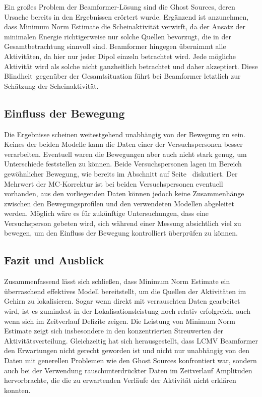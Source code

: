 \documentclass[doc,a4paper,12pt]{apa6}
\makeatletter
\DeclareRobustCommand*{\nameref}[1]{%
      \glqq{\myorg@nameref{#1}}\grqq%
    }%
\makeatother
\begin{document}
Ein großes Problem der Beamformer-Lösung sind die Ghost Sources, deren Ursache bereits in den Ergebnissen erörtert wurde. Ergänzend ist anzunehmen, dass Minimum Norm Estimate die Scheinaktivität verwirft, da der Ansatz der minimalen Energie richtigerweise nur solche Quellen bevorzugt, die in der Gesamtbetrachtung sinnvoll sind. Beamformer hingegen übernimmt alle Aktivitäten, da hier nur jeder Dipol einzeln betrachtet wird. Jede mögliche Aktivität wird als solche nicht ganzheitlich betrachtet und daher akzeptiert. Diese \glqq Blindheit\grqq ~gegenüber der Gesamtsituation führt bei Beamformer letztlich zur Schätzung der Scheinaktivität.

\subsection{Einfluss der Bewegung}

Die Ergebnisse scheinen weitestgehend unabhängig von der Bewegung zu sein. Keines der beiden Modelle kann die Daten einer der Versuchspersonen besser verarbeiten. Eventuell waren die Bewegungen aber auch nicht stark genug, um Unterschiede feststellen zu können. Beide Versuchspersonen lagen im Bereich gewöhnlicher Bewegung, wie bereits im Abschnitt \nameref{sec:ergebnis-vorverarbeitung} auf Seite~\pageref{sec:ergebnis-vorverarbeitung} diskutiert. Der Mehrwert der MC-Korrektur ist bei beiden Versuchspersonen eventuell vorhanden, aus den vorliegenden Daten können jedoch keine Zusammenhänge zwischen den Bewegungsprofilen und den verwendeten Modellen abgeleitet werden. Möglich wäre es für zukünftige Untersuchungen, dass eine Versuchsperson gebeten wird, sich während einer Messung absichtlich viel zu bewegen, um den Einfluss der Bewegung kontrolliert überprüfen zu können.

\subsection{Fazit und Ausblick}

Zusammenfassend lässt sich schließen, dass Minimum Norm Estimate ein überraschend effektives Modell bereitstellt, um die Quellen der Aktivitäten im Gehirn zu lokalisieren. Sogar wenn direkt mit verrauschten Daten gearbeitet wird, ist es zumindest in der Lokalisationsleistung noch relativ erfolgreich, auch wenn sich im Zeitverlauf Defizite zeigen. Die Leistung von Minimum Norm Estimate zeigt sich insbesondere in den konzentrierten Streuwerten der Aktivitätsverteilung. Gleichzeitig hat sich herausgestellt, dass LCMV Beamformer den Erwartungen nicht gerecht geworden ist und nicht nur unabhängig von den Daten mit generellen Problemen wie den Ghost Sources konfrontiert war, sondern auch bei der Verwendung rauschunterdrückter Daten im Zeitverlauf Amplituden hervorbrachte, die die zu erwartenden Verläufe der Aktivität nicht erklären konnten.
\end{document}
